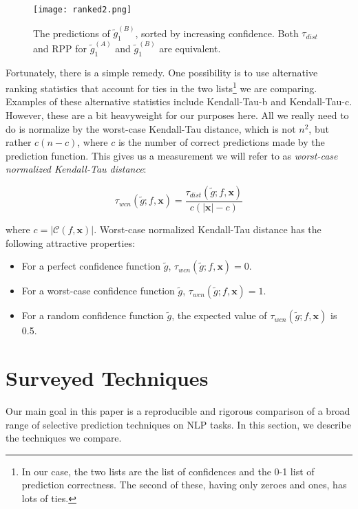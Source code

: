 \documentclass[11pt]{article}
\begin{document}
\begin{figure}
\centering
\texttt{[image: ranked2.png]}
\caption{The predictions of $\tilde{g}_1^{(B)}$, sorted by increasing confidence. Both $\tau_{dist}$ and RPP for $\tilde{g}_1^{(A)}$ and $\tilde{g}_1^{(B)}$ are equivalent.}
\label{fig:ranked2}
\end{figure}

Fortunately, there is a simple remedy. One possibility is to use alternative ranking statistics that account for ties in the two lists\footnote{In our case, the two lists are the list of confidences and the 0-1 list of prediction correctness. The second of these, having only zeroes and ones, has lots of ties.} we are comparing. Examples of these alternative statistics include Kendall-Tau-b and Kendall-Tau-c. However, these are a bit heavyweight for our purposes here. All we really need to do is normalize by the worst-case Kendall-Tau distance, which is not $n^2$, but rather $c(n-c)$, where $c$ is the number of correct predictions made by the prediction function. This gives us a measurement we will refer to as \emph{worst-case normalized Kendall-Tau distance}:

\begin{equation}
\tau_{wcn}(\tilde{g} ; f, \mathbf{x}) = \frac{\tau_{dist}(\tilde{g} ; f, \mathbf{x})}{c(|\mathbf{x}|-c)}
\end{equation}

\noindent where $c = |\mathcal{C}(f, \mathbf{x})|$. Worst-case normalized Kendall-Tau distance has the following attractive properties:

\begin{itemize}
	\item For a perfect confidence function $\tilde{g}$, $\tau_{wcn}(\tilde{g} ; f, \mathbf{x}) = 0$.
	\item For a worst-case confidence function $\tilde{g}$, $\tau_{wcn}(\tilde{g} ; f, \mathbf{x}) = 1$.
	\item For a random confidence function $\tilde{g}$, the expected value of $\tau_{wcn}(\tilde{g} ; f, \mathbf{x})$ is 0.5.
\end{itemize}


\section{Surveyed Techniques}

Our main goal in this paper is a reproducible and rigorous comparison of a broad range of selective prediction techniques on NLP tasks. In this section, we describe the techniques we compare. 
\end{document}

